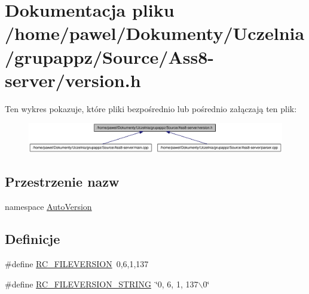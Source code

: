 \hypertarget{a00017}{
\section{Dokumentacja pliku /home/pawel/Dokumenty/Uczelnia/grupappz/Source/Ass8-server/version.h}
\label{d4/d51/a00017}
}


Ten wykres pokazuje, które pliki bezpośrednio lub pośrednio załączają ten plik:\nopagebreak
\begin{figure}[H]
\begin{center}
\leavevmode
\includegraphics[width=372pt]{d5/de0/a00050}
\end{center}
\end{figure}
\subsection*{Przestrzenie nazw}
\begin{CompactItemize}
\item 
namespace \hyperlink{a00019}{AutoVersion}
\end{CompactItemize}
\subsection*{Definicje}
\begin{CompactItemize}
\item 
\#define \hyperlink{a00017_0e86d046ea87587e402d375c6b0927c6}{RC\_\-FILEVERSION}~0,6,1,137
\item 
\#define \hyperlink{a00017_4763e81d3c29ec0fab79225d3ec3f1a2}{RC\_\-FILEVERSION\_\-STRING}~\char`\"{}0, 6, 1, 137$\backslash$0\char`\"{}
\end{CompactItemize}
